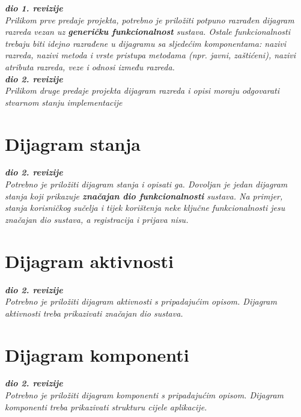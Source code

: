 			\textbf{\textit{dio 1. revizije}}\\
			
			\textit{Prilikom prve predaje projekta, potrebno je priložiti potpuno razrađen dijagram razreda vezan uz \textbf{generičku funkcionalnost} sustava. Ostale funkcionalnosti trebaju biti idejno razrađene u dijagramu sa sljedećim komponentama: nazivi razreda, nazivi metoda i vrste pristupa metodama (npr. javni, zaštićeni), nazivi atributa razreda, veze i odnosi između razreda.}\\
			
			\textbf{\textit{dio 2. revizije}}\\			
			
			\textit{Prilikom druge predaje projekta dijagram razreda i opisi moraju odgovarati stvarnom stanju implementacije}
			
			
			
			\eject
		
		\section{Dijagram stanja}
			
			
			\textbf{\textit{dio 2. revizije}}\\
			
			\textit{Potrebno je priložiti dijagram stanja i opisati ga. Dovoljan je jedan dijagram stanja koji prikazuje \textbf{značajan dio funkcionalnosti} sustava. Na primjer, stanja korisničkog sučelja i tijek korištenja neke ključne funkcionalnosti jesu značajan dio sustava, a registracija i prijava nisu. }
			
			
			\eject 
		
		\section{Dijagram aktivnosti}
			
			\textbf{\textit{dio 2. revizije}}\\
			
			 \textit{Potrebno je priložiti dijagram aktivnosti s pripadajućim opisom. Dijagram aktivnosti treba prikazivati značajan dio sustava.}
			
			\eject
		\section{Dijagram komponenti}
		
			\textbf{\textit{dio 2. revizije}}\\
		
			 \textit{Potrebno je priložiti dijagram komponenti s pripadajućim opisom. Dijagram komponenti treba prikazivati strukturu cijele aplikacije.}